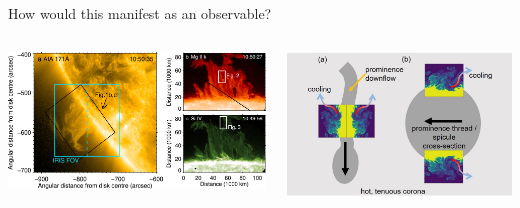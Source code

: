 \documentclass[10pt,aspectratio=169,usenames,dvipsnames]{beamer}
\begin{document}
\begin{frame}{How would this manifest as an observable?}
\begin{columns}
\begin{column}{0.6\textwidth}
\includegraphics[width=0.95\linewidth]{2023Dundee/Figures/khiprominence.jpg}
\end{column}
\begin{column}{0.4\textwidth}
\includegraphics[width=0.95\linewidth]{2023Dundee/Figures/schematic.jpg}
\end{column}
\end{columns}
\end{frame}
\end{document}
